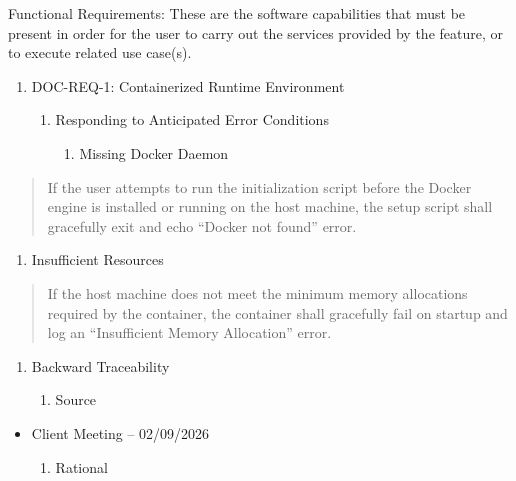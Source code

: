 Functional Requirements: These are the software capabilities that must
be present in order for the user to carry out the services provided by
the feature, or to execute related use case(s).

\begin{enumerate}
\def\labelenumi{\Roman{enumi})}
\item
  DOC-REQ-1: Containerized Runtime Environment

  \begin{enumerate}
  \def\labelenumii{\alph{enumii}.}
  \item
    Responding to Anticipated Error Conditions

    \begin{enumerate}
    \def\labelenumiii{\roman{enumiii}.}
    \item
      Missing Docker Daemon
    \end{enumerate}
  \end{enumerate}
\end{enumerate}

\begin{quote}
If the user attempts to run the initialization script before the Docker
engine is installed or running on the host machine, the setup script
shall gracefully exit and echo ``Docker not found'' error.
\end{quote}

\begin{enumerate}
\def\labelenumi{\roman{enumi}.}
\setcounter{enumi}{1}
\item
  Insufficient Resources
\end{enumerate}

\begin{quote}
If the host machine does not meet the minimum memory allocations
required by the container, the container shall gracefully fail on
startup and log an ``Insufficient Memory Allocation'' error.
\end{quote}

\begin{enumerate}
\def\labelenumi{\alph{enumi}.}
\setcounter{enumi}{1}
\item
  Backward Traceability

  \begin{enumerate}
  \def\labelenumii{\roman{enumii}.}
  \item
    Source
  \end{enumerate}
\end{enumerate}

\begin{itemize}
\item
  Client Meeting -- 02/09/2026

  \begin{enumerate}
  \def\labelenumi{\roman{enumi}.}
  \item
    Rational
  \end{enumerate}
\end{itemize}

